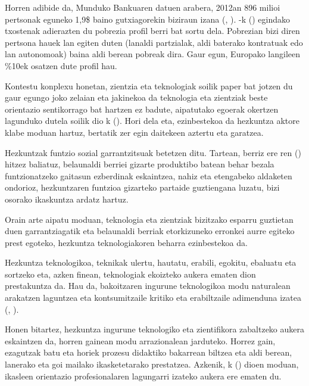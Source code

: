 Horren adibide da, Munduko Bankuaren datuen arabera, 2012an 896 milioi pertsonak eguneko 1,9\$ baino gutxiagorekin biziraun izana (\citeauthor{migoyaxxi}, \citeyear{migoyaxxi}). \citeauthor{menendez2017europe}-k (\citeyear{menendez2017europe}) egindako txostenak adierazten du pobrezia profil berri bat sortu dela. Pobrezian bizi diren pertsona hauek lan egiten duten (lanaldi partzialak, aldi baterako kontratuak edo lan autonomoak) baina aldi berean pobreak dira. Gaur egun, Europako langileen \%10ek osatzen dute profil hau.

Kontestu konplexu honetan, zientzia eta teknologiak soilik paper bat jotzen du gaur egungo joko zelaian eta jakinekoa da teknologia eta zientziak beste orientazio sentikorrago bat hartzen ez badute, aipatutako egoerak okertzen lagunduko dutela soilik dio \citeauthor{osorio2002educacion}k (\citeyear{osorio2002educacion}). Hori dela eta, ezinbestekoa da hezkuntza aktore klabe moduan hartuz, bertatik zer egin daitekeen aztertu eta garatzea.

Hezkuntzak funtzio sozial garrantzitsuak betetzen ditu. Tartean, berriz ere \citeauthor{acevedo1998ciencia}ren (\citeyear{acevedo1998ciencia}) hitzez baliatuz, belaunaldi berriei gizarte produktibo batean behar bezala funtzionatzeko gaitasun ezberdinak eskaintzea, nahiz eta etengabeko aldaketen ondorioz, hezkuntzaren funtzioa gizarteko partaide guztiengana luzatu, bizi osorako ikaskuntza ardatz hartuz.

Orain arte aipatu moduan, teknologia eta zientziak bizitzako esparru guztietan duen garrantziagatik eta belaunaldi berriak etorkizuneko erronkei aurre egiteko prest egoteko, hezkuntza teknologiakoren beharra ezinbestekoa da.

Hezkuntza teknologikoa, teknikak ulertu, hautatu, erabili, egokitu, ebaluatu eta sortzeko eta, azken finean, teknologiak ekoizteko aukera ematen dion prestakuntza da. Hau da, bakoitzaren ingurune teknologikoa modu naturalean arakatzen laguntzea eta kontsumitzaile kritiko eta erabiltzaile adimenduna izatea (\citeauthor{grau2016educacion}, \citeyear{grau2016educacion}).

Honen bitartez, hezkuntza ingurune teknologiko eta zientifikora zabaltzeko aukera eskaintzen da, horren gainean modu arrazionalean jarduteko. Horrez gain, ezagutzak batu eta horiek prozesu didaktiko bakarrean biltzea eta aldi berean, lanerako eta goi mailako ikasketetarako prestatzea. Azkenik, \citeauthor{grau2016educacion}k (\citeyear{grau2016educacion}) dioen moduan, ikasleen orientazio profesionalaren lagungarri izateko aukera ere ematen du.

